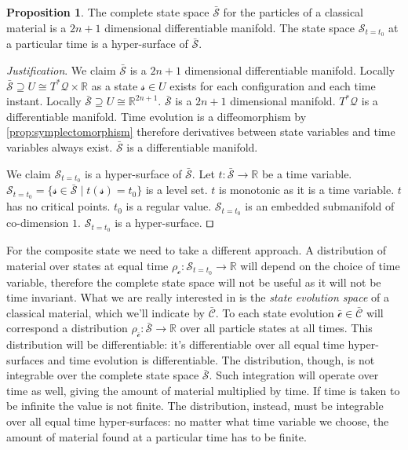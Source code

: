 \documentclass[smallextended]{svjour3}
\numberwithin{equation}{section}
\newenvironment{justification}{\emph{Justification}.}{\hfill\(\qed\)}
\theoremstyle{definition}
\newtheorem{prop}[equation]{Proposition}
\newenvironment{justification}{\emph{Justification}.}{\qed}
\begin{document}
\begin{prop}\label{prop:complete_particle_state_space}
	The complete state space $\bar{\mathcal{S}}$ for the particles of a classical material is a $2n+1$ dimensional differentiable manifold. The state space $\mathcal{S}_{t=t_0}$ at a particular time is a hyper-surface of $\bar{\mathcal{S}}$.
\end{prop}

\begin{justification}
	We claim $\bar{\mathcal{S}}$ is a $2n+1$ dimensional differentiable manifold. Locally $\bar{\mathcal{S}} \supseteq U \cong T^*\mathcal{Q}\times \mathbb{R}$ as a state $\mathcal{s} \in U$ exists for each configuration and each time instant. Locally $\bar{\mathcal{S}} \supseteq U \cong\mathbb{R}^{2n+1}$. $\bar{\mathcal{S}}$ is a $2n+1$ dimensional manifold. $T^*\mathcal{Q}$ is a differentiable manifold. Time evolution is a diffeomorphism by \ref{prop:symplectomorphism} therefore derivatives between state variables and time variables always exist. $\bar{\mathcal{S}}$ is a differentiable manifold.
	
	We claim $\mathcal{S}_{t=t_0}$ is a hyper-surface of $\bar{\mathcal{S}}$. Let $t : \bar{\mathcal{S}} \rightarrow \mathbb{R}$ be a time variable. $\mathcal{S}_{t=t_0} = \{ \mathcal{s} \in \bar{\mathcal{S}} \; | \; t(\mathcal{s}) = t_0 \}$ is a level set. $t$ is monotonic as it is a time variable. $t$ has no critical points. $t_0$ is a regular value. $\mathcal{S}_{t=t_0}$ is an embedded submanifold of co-dimension $1$. $\mathcal{S}_{t=t_0}$ is a hyper-surface.
\end{justification}

For the composite state we need to take a different approach. A distribution of material over states at equal time $\rho_\mathcal{c} : \mathcal{S}_{t=t_0} \rightarrow \mathbb{R}$ will depend on the choice of time variable, therefore the complete state space will not be useful as it will not be time invariant. What we are really interested in is the \emph{state evolution space} of a classical material, which we'll indicate by $\bar{\mathcal{C}}$. To each state evolution $\bar{\mathcal{c}} \in \bar{\mathcal{C}}$ will correspond a distribution $\rho_{\bar{\mathcal{c}}} : \bar{\mathcal{S}} \rightarrow \mathbb{R}$ over all particle states at all times. This distribution will be differentiable: it's differentiable over all equal time hyper-surfaces and time evolution is differentiable. The distribution, though, is not integrable over the complete state space $\bar{\mathcal{S}}$. Such integration will operate over time as well, giving the amount of material multiplied by time. If time is taken to be infinite the value is not finite. The distribution, instead, must be integrable over all equal time hyper-surfaces: no matter what time variable we choose, the amount of material found at a particular time has to be finite.
\end{document}
